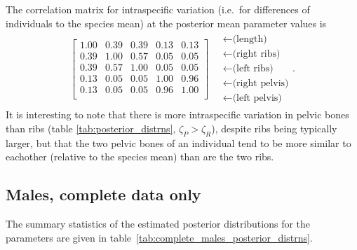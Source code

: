 \documentclass[12pt]{article}
\begin{document}
The correlation matrix for intraspecific variation 
(i.e.\ for differences of individuals to the species mean)
at the posterior mean parameter values is
\begin{align}
\begin{bmatrix}
   1.00 & 0.39 & 0.39 & 0.13 & 0.13 \\ 
   0.39 & 1.00 & 0.57 & 0.05 & 0.05 \\ 
   0.39 & 0.57 & 1.00 & 0.05 & 0.05 \\ 
   0.13 & 0.05 & 0.05 & 1.00 & 0.96 \\ 
   0.13 & 0.05 & 0.05 & 0.96 & 1.00 \\ 
 \end{bmatrix}
\quad \begin{matrix}
  \leftarrow \text{(length)} \\
  \leftarrow \text{(right ribs)} \\
  \leftarrow \text{(left ribs)} \\
  \leftarrow \text{(right pelvis)} \\
  \leftarrow \text{(left pelvis)} 
\end{matrix}  .
\end{align}
It is interesting to note that there is more intraspecific variation in pelvic bones than ribs (table \ref{tab:posterior_distrns}, $\zeta_P > \zeta_R$),
despite ribs being typically larger,
but that the two pelvic bones of an individual tend to be more similar to eachother (relative to the species mean) than are the two ribs.


\subsection*{Males, complete data only}

The summary statistics of the estimated posterior distributions 
for the parameters
are given in table~\ref{tab:complete_males_posterior_distrns}.
\end{document}
